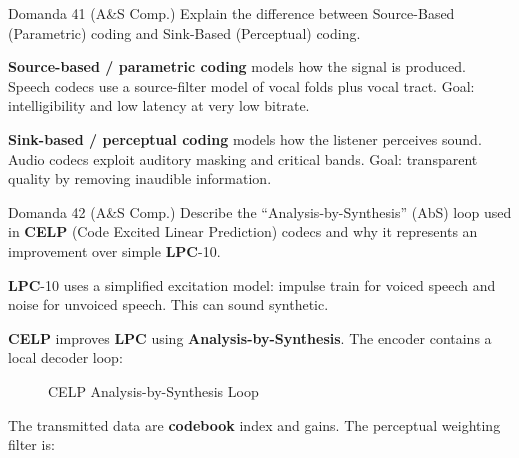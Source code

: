 \begin{questionbox}{Domanda 41}
(A\&S Comp.) Explain the difference between Source-Based (Parametric) coding and Sink-Based (Perceptual) coding.
\end{questionbox}


\textbf{Source-based / parametric coding} models how the signal is produced. Speech codecs use a source-filter model of vocal folds plus vocal tract. Goal: intelligibility and low latency at very low bitrate.

\textbf{Sink-based / perceptual coding} models how the listener perceives sound. Audio codecs exploit auditory masking and critical bands. Goal: transparent quality by removing inaudible information.



\begin{questionbox}{Domanda 42}
(A\&S Comp.) Describe the “Analysis-by-Synthesis” (AbS) loop used in \textbf{CELP} (Code Excited Linear Prediction) codecs and why it represents an improvement over simple \textbf{LPC}-10.
\end{questionbox}


\textbf{LPC}-10 uses a simplified excitation model: impulse train for voiced speech and noise for unvoiced speech. This can sound synthetic.

\textbf{CELP} improves \textbf{LPC} using \textbf{Analysis-by-Synthesis}. The encoder contains a local decoder loop:


\begin{figure}[H]
\centering
{}
\caption{CELP Analysis-by-Synthesis Loop}
\end{figure}


The transmitted data are \textbf{codebook} index and gains. The perceptual weighting filter is:


